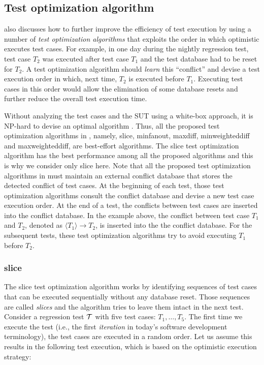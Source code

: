 \documentclass[authoryear,preprint,12pt]{elsarticle}
\begin{document}
  \subsection{Test optimization algorithm}
     \cite{cidr05} also discusses how to further improve the efficiency of test execution
      by using a number of \emph{test optimization algorithms} that exploits the order in which {\sc optimistic} executes test cases.
      For example, in one day during the nightly regression test, test case $T_2$ was executed after test case $T_1$ and the test database had to be reset for $T_2$.
      A test optimization algorithm should \emph{learn} this ``conflict'' and devise a test execution order 
      in which, next time, $T_2$ is executed before $T_1$.  
      Executing test cases in this order would allow the elimination of 
      some database resets and further reduce the overall test execution time.
		             
		  Without analyzing the test cases and the SUT using a white-box approach, it is NP-hard to devise an optimal algorithm \cite{cidr05}.
      Thus, all the proposed test optimization algorithms in \cite{cidr05}, 
      namely, {\sc slice}, {\sc minfanout}, {\sc maxdiff}, {\sc minweighteddiff} and {\sc maxweighteddiff},
      are best-effort algorithms.  
      The {\sc slice} test optimization algorithm has the best 
      performance 
      among all the proposed algorithms and this is why we consider only {\sc slice} here.
      Note that all the proposed test optimization algorithms in \cite{cidr05} must maintain an external conflict database that 
      stores the detected conflict of test cases.
      At the beginning of each test, those test optimization algorithms consult the conflict database and devise a new test case execution order.
      At the end of a test, the conflicts between test cases are inserted into the conflict database.
      In the example above, 
      the conflict between test case $T_1$ and $T_2$, denoted as $\langle T_1 \rangle \rightarrow T_2$, is inserted into the the conflict database.
      For the subsequent tests, these test optimization algorithms try to avoid executing $T_1$ before $T_2$.
      
      \subsubsection{{\sc slice}}
      \label{slice}
      The {\sc slice} test optimization algorithm works by identifying sequences of test cases that can be executed sequentially 
      without any database reset.   Those sequences are called \emph{slices} and the algorithm tries to leave them intact in the next test.
      Consider a regression test $\cal{T}$ with five test cases: $T_1, \ldots, T_5$.
      The first time we execute the test (i.e., the first \emph{iteration} in today's software development terminology), 
      the test cases are executed in a random order.
      Let us assume this results in the following test execution, which is based on the {\sc optimistic} execution strategy:
\end{document}
